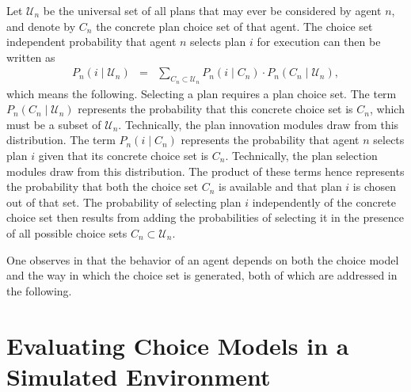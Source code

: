 Let $\mathcal{U}_n$ be the universal set of all plans that may ever be considered
by agent $n$, and denote by $C_{n}$ the concrete plan choice set
of that agent. The choice set independent probability that agent $n$
selects plan $i$ for execution can then be written as
\begin{eqnarray}
P_{n}(i\mid \mathcal{U}_n) & = & \sum_{C_{n}\subset \mathcal{U}_n}P_{n}(i\mid C_{n})\cdot P_{n}(C_{n}\mid \mathcal{U}_n),
\label{eq:unconditional-choice-proba}
\end{eqnarray}
which means the following. Selecting a plan requires a plan choice
set. The term $P_{n}(C_{n}\mid \mathcal{U}_n)$ represents the probability that
this concrete choice set is $C_{n}$, which must be a subset of $\mathcal{U}_n$.
Technically, the plan innovation modules draw from this distribution.
The term $P_{n}(i\mid C_{n})$ represents the probability that agent
$n$ selects plan $i$ given that its concrete choice set is $C_{n}$.
Technically, the plan selection modules draw from this distribution.
The product of these terms hence represents the probability that both
the choice set $C_{n}$ is available and that plan $i$ is chosen out
of that set. The probability of selecting plan $i$ independently
of the concrete choice set then results from adding the probabilities
of selecting it in the presence of all possible choice sets $C_{n}\subset \mathcal{U}_n$.

One observes in  that the
behavior of an agent depends on both the choice model and the way
in which the choice set is generated, both of which are addressed
in the following.

\section{\label{sec:Evaluating-choice-models}Evaluating Choice Models in
a Simulated Environment}

